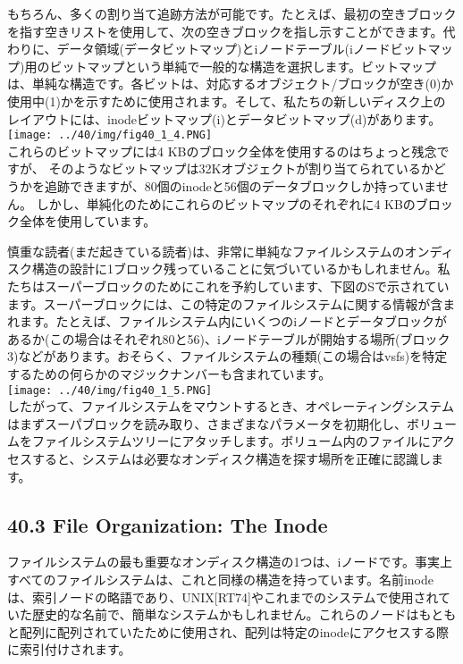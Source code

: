 もちろん、多くの割り当て追跡方法が可能です。たとえば、最初の空きブロックを指す空きリストを使用して、次の空きブロックを指し示すことができます。代わりに、データ領域(データビットマップ)とiノードテーブル(iノードビットマップ)用のビットマップという単純で一般的な構造を選択します。ビットマップは、単純な構造です。各ビットは、対応するオブジェクト/ブロックが空き(0)か使用中(1)かを示すために使用されます。そして、私たちの新しいディスク上のレイアウトには、inodeビットマップ(i)とデータビットマップ(d)があります。\\
\texttt{[image: ../40/img/fig40\_1\_4.PNG]}\\
これらのビットマップには4
KBのブロック全体を使用するのはちょっと残念ですが、
そのようなビットマップは32Kオブジェクトが割り当てられているかどうかを追跡できますが、80個のinodeと56個のデータブロックしか持っていません。
しかし、単純化のためにこれらのビットマップのそれぞれに4
KBのブロック全体を使用しています。

慎重な読者(まだ起きている読者)は、非常に単純なファイルシステムのオンディスク構造の設計に1ブロック残っていることに気づいているかもしれません。私たちはスーパーブロックのためにこれを予約しています、下図のSで示されています。スーパーブロックには、この特定のファイルシステムに関する情報が含まれます。たとえば、ファイルシステム内にいくつのiノードとデータブロックがあるか(この場合はそれぞれ80と56)、iノードテーブルが開始する場所(ブロック3)などがあります。おそらく、ファイルシステムの種類(この場合はvsfs)を特定するための何らかのマジックナンバーも含まれています。\\
\texttt{[image: ../40/img/fig40\_1\_5.PNG]}\\
したがって、ファイルシステムをマウントするとき、オペレーティングシステムはまずスーパブロックを読み取り、さまざまなパラメータを初期化し、ボリュームをファイルシステムツリーにアタッチします。ボリューム内のファイルにアクセスすると、システムは必要なオンディスク構造を探す場所を正確に認識します。

\hypertarget{file-organization-the-inode}{%
\subsection*{40.3 File Organization: The
Inode}\label{file-organization-the-inode}}

ファイルシステムの最も重要なオンディスク構造の1つは、iノードです。事実上すべてのファイルシステムは、これと同様の構造を持っています。名前inodeは、索引ノードの略語であり、UNIX{[}RT74{]}やこれまでのシステムで使用されていた歴史的な名前で、簡単なシステムかもしれません。これらのノードはもともと配列に配列されていたために使用され、配列は特定のinodeにアクセスする際に索引付けされます。

